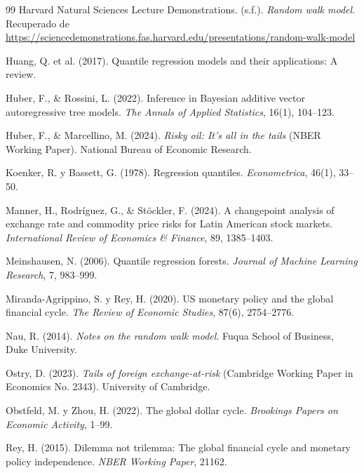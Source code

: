 ﻿\documentclass[11pt,a4paper]{article}
\begin{document}
\begin{thebibliography}{99}
Harvard Natural Sciences Lecture Demonstrations. (s.f.). \textit{Random walk model}. Recuperado de \url{https://sciencedemonstrations.fas.harvard.edu/presentations/random-walk-model}

Huang, Q. et al. (2017). Quantile regression models and their applications: A review. %

Huber, F., \& Rossini, L. (2022). Inference in Bayesian additive vector autoregressive tree models. \textit{The Annals of Applied Statistics}, 16(1), 104--123.

Huber, F., \& Marcellino, M. (2024). \textit{Risky oil: It's all in the tails} (NBER Working Paper). National Bureau of Economic Research.

Koenker, R. y Bassett, G. (1978). Regression quantiles. \textit{Econometrica}, 46(1), 33--50.

Manner, H., Rodríguez, G., \& Stöckler, F. (2024). A changepoint analysis of exchange rate and commodity price risks for Latin American stock markets. \textit{International Review of Economics \& Finance}, 89, 1385--1403.

Meinshausen, N. (2006). Quantile regression forests. \textit{Journal of Machine Learning Research}, 7, 983--999.

Miranda-Agrippino, S. y Rey, H. (2020). US monetary policy and the global financial cycle. \textit{The Review of Economic Studies}, 87(6), 2754--2776.

Nau, R. (2014). \textit{Notes on the random walk model}. Fuqua School of Business, Duke University.


Ostry, D. (2023). \textit{Tails of foreign exchange-at-risk} (Cambridge Working Paper in Economics No. 2343). University of Cambridge.

Obstfeld, M. y Zhou, H. (2022). The global dollar cycle. \textit{Brookings Papers on Economic Activity}, 1--99.

Rey, H. (2015). Dilemma not trilemma: The global financial cycle and monetary policy independence. \textit{NBER Working Paper}, 21162.


\end{thebibliography}
\end{document}
